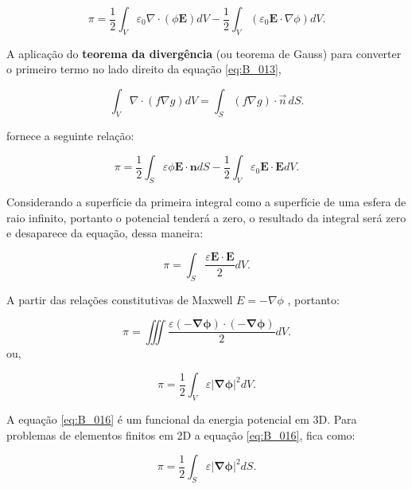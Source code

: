 \documentclass[
12pt,
a4paper,
oneside,
chapter=TITLE,
sumario=tradicional
]{abntex2}
\begin{document}
\begin{equation}
	\pi = \frac{1}{2} \int_V  \varepsilon_0 \nabla \cdot (\phi \mathbf{E}) dV
	- \frac{1}{2} \int_V  (\varepsilon_0 \mathbf{E} \cdot \nabla \phi)dV.  
	\label{eq:B_013}
\end{equation}

A aplicação do \textbf{teorema da divergência}  \cite{vilches2011calculo}  (ou teorema de Gauss) para converter o primeiro termo no lado direito da equação \ref{eq:B_013}, 


\begin{tcolorbox}[colback=red!5, colframe=red!40!black, title=\textbf{Teorema da divergência ou teorema de de Gauss}]
	$$
	\int_V \nabla \cdot (f \nabla g)dV = \int_S (f \nabla g) \cdot \vec{n}\, dS.
	$$
\end{tcolorbox}
\noindent fornece a seguinte relação:

\begin{equation}
	\pi = \frac{1}{2} \int_S  \varepsilon \phi \mathbf{E} \cdot \mathbf{n} dS
	- \frac{1}{2} \int_V  \varepsilon_0 \mathbf{E} \cdot \mathbf{E} dV.  
	\label{eq:B_014}
\end{equation}

Considerando a superfície da primeira integral como a superfície de uma esfera de raio infinito, portanto o potencial tenderá a zero, o resultado da integral será zero e desaparece da equação, dessa maneira:

\begin{equation}
	\pi = \int_S \frac{\varepsilon \mathbf{E} \cdot \mathbf{E}}{2} dV.  
	\label{eq:B_015}
\end{equation}

A partir das relações constitutivas de Maxwell $E = -\nabla \phi$ , portanto:


\begin{equation*}
	\pi = \iiint  \frac{\varepsilon (\mathbf{-\nabla\phi}) \cdot \mathbf{(\mathbf{-\nabla\phi})}}{2} dV.
\end{equation*}
ou,

\begin{equation}
	\pi = \frac{1}{2} \int_V  \varepsilon \mathbf{|\nabla\phi}|^2 dV.  
	\label{eq:B_016}
\end{equation}

A equação \ref{eq:B_016} é um funcional da energia potencial em 3D. Para problemas de elementos finitos em 2D a equação \ref{eq:B_016}, fica como:

\begin{equation}
	\pi = \frac{1}{2} \int_S  \varepsilon \mathbf{|\nabla\phi}|^2 dS.  
	\label{eq:B_017}
\end{equation}
\end{document}
